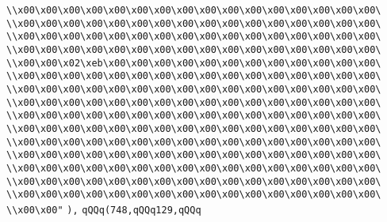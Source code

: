 \verb|\\x00\x00\x00\x00\x00\x00\x00\x00\x00\x00\x00\x00\x00\x00\x00\x00\|\newline
\verb|\\x00\x00\x00\x00\x00\x00\x00\x00\x00\x00\x00\x00\x00\x00\x00\x00\|\newline
\verb|\\x00\x00\x00\x00\x00\x00\x00\x00\x00\x00\x00\x00\x00\x00\x00\x00\|\newline
\verb|\\x00\x00\x00\x00\x00\x00\x00\x00\x00\x00\x00\x00\x00\x00\x00\x00\|\newline
\verb|\\x00\x00\x02\xeb\x00\x00\x00\x00\x00\x00\x00\x00\x00\x00\x00\x00\|\newline
\verb|\\x00\x00\x00\x00\x00\x00\x00\x00\x00\x00\x00\x00\x00\x00\x00\x00\|\newline
\verb|\\x00\x00\x00\x00\x00\x00\x00\x00\x00\x00\x00\x00\x00\x00\x00\x00\|\newline
\verb|\\x00\x00\x00\x00\x00\x00\x00\x00\x00\x00\x00\x00\x00\x00\x00\x00\|\newline
\verb|\\x00\x00\x00\x00\x00\x00\x00\x00\x00\x00\x00\x00\x00\x00\x00\x00\|\newline
\verb|\\x00\x00\x00\x00\x00\x00\x00\x00\x00\x00\x00\x00\x00\x00\x00\x00\|\newline
\verb|\\x00\x00\x00\x00\x00\x00\x00\x00\x00\x00\x00\x00\x00\x00\x00\x00\|\newline
\verb|\\x00\x00\x00\x00\x00\x00\x00\x00\x00\x00\x00\x00\x00\x00\x00\x00\|\newline
\verb|\\x00\x00\x00\x00\x00\x00\x00\x00\x00\x00\x00\x00\x00\x00\x00\x00\|\newline
\verb|\\x00\x00\x00\x00\x00\x00\x00\x00\x00\x00\x00\x00\x00\x00\x00\x00\|\newline
\verb|\\x00\x00\x00\x00\x00\x00\x00\x00\x00\x00\x00\x00\x00\x00\x00\x00\|\newline
\verb|\\x00\x00"|\newline
\verb|),|\newline
\verb|qQQq(748,qQQq129,qQQq|\newline
